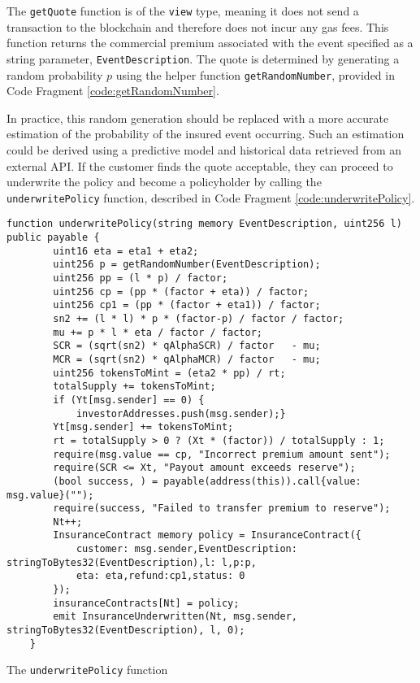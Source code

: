 \documentclass[10pt]{article}
\begin{document}
The \texttt{getQuote} function is of the \texttt{view} type, meaning it does not send a transaction to the blockchain and therefore does not incur any gas fees. This function returns the commercial premium associated with the event specified as a string parameter, \texttt{EventDescription}. The quote is determined by generating a random probability \(p\) using the helper function \texttt{getRandomNumber}, provided in Code Fragment \ref{code:getRandomNumber}. 

In practice, this random generation should be replaced with a more accurate estimation of the probability of the insured event occurring. Such an estimation could be derived using a predictive model and historical data retrieved from an external API. If the customer finds the quote acceptable, they can proceed to underwrite the policy and become a policyholder by calling the \texttt{underwritePolicy} function, described in Code Fragment \ref{code:underwritePolicy}.


\begin{codefragment}[!h]
\begin{lstlisting}[language=Solidity]
    function underwritePolicy(string memory EventDescription, uint256 l) public payable {
        uint16 eta = eta1 + eta2;
        uint256 p = getRandomNumber(EventDescription);
        uint256 pp = (l * p) / factor;
        uint256 cp = (pp * (factor + eta)) / factor;
        uint256 cp1 = (pp * (factor + eta1)) / factor;
        sn2 += (l * l) * p * (factor-p) / factor / factor;
        mu += p * l * eta / factor / factor;
        SCR = (sqrt(sn2) * qAlphaSCR) / factor   - mu;
        MCR = (sqrt(sn2) * qAlphaMCR) / factor   - mu;
        uint256 tokensToMint = (eta2 * pp) / rt;
        totalSupply += tokensToMint;
        if (Yt[msg.sender] == 0) {
            investorAddresses.push(msg.sender);}
        Yt[msg.sender] += tokensToMint;
        rt = totalSupply > 0 ? (Xt * (factor)) / totalSupply : 1;
        require(msg.value == cp, "Incorrect premium amount sent");
        require(SCR <= Xt, "Payout amount exceeds reserve");
        (bool success, ) = payable(address(this)).call{value: msg.value}("");
        require(success, "Failed to transfer premium to reserve");
        Nt++;
        InsuranceContract memory policy = InsuranceContract({
            customer: msg.sender,EventDescription: stringToBytes32(EventDescription),l: l,p:p,
            eta: eta,refund:cp1,status: 0
        });
        insuranceContracts[Nt] = policy;
        emit InsuranceUnderwritten(Nt, msg.sender, stringToBytes32(EventDescription), l, 0);
    }
\end{lstlisting}
    \caption{The \texttt{underwritePolicy} function}
    \label{code:underwritePolicy}
\end{codefragment}
\end{document}
